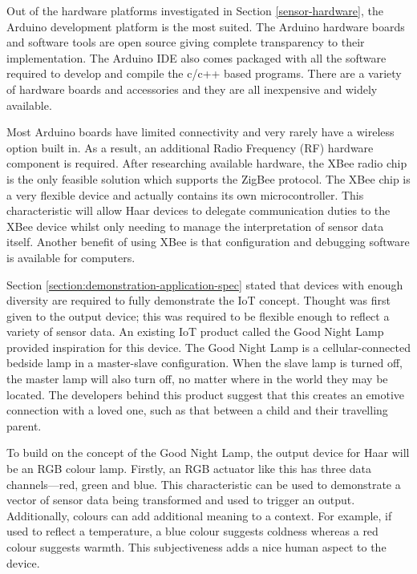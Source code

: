         Out of the hardware platforms investigated in Section \ref{sensor-hardware}, the Arduino development platform is the most suited. The Arduino hardware boards and software tools are open source giving complete transparency to their implementation. The Arduino IDE also comes packaged with all the software required to develop and compile the c/c++ based programs. There are a variety of hardware boards and accessories and they are all inexpensive and widely available.

        Most Arduino boards have limited connectivity and very rarely have a wireless option built in. As a result, an additional Radio Frequency (RF) hardware component is required. After researching available hardware, the XBee radio chip is the only feasible solution which supports the ZigBee protocol. The XBee chip is a very flexible device and actually contains its own microcontroller. This characteristic will allow Haar devices to delegate communication duties to the XBee device whilst only needing to manage the interpretation of sensor data itself. Another benefit of using XBee is that configuration and debugging software is available for computers.

        Section \ref{section:demonstration-application-spec} stated that devices with enough diversity are required to fully demonstrate the IoT concept. Thought was first given to the output device; this was required to be flexible enough to reflect a variety of sensor data. An existing IoT product called the Good Night Lamp provided inspiration for this device. The Good Night Lamp is a cellular-connected bedside lamp in a master-slave configuration. When the slave lamp is turned off, the master lamp will also turn off, no matter where in the world they may be located. The developers behind this product suggest that this creates an emotive connection with a loved one, such as that between a child and their travelling parent.

        To build on the concept of the Good Night Lamp, the output device for Haar will be an RGB colour lamp. Firstly, an RGB actuator like this has three data channels---red, green and blue. This characteristic can be used to demonstrate a vector of sensor data being transformed and used to trigger an output. Additionally, colours can add additional meaning to a context. For example, if used to reflect a temperature, a blue colour suggests coldness whereas a red colour suggests warmth. This subjectiveness adds a nice human aspect to the device.

